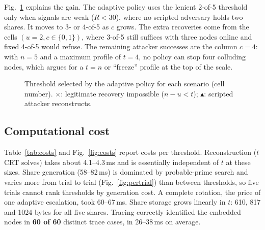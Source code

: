 \documentclass[conference]{IEEEtran}
\begin{document}
Fig.~\ref{fig:grid} explains the gain. The adaptive policy uses the lenient 2-of-5 threshold only when signals are weak ($R<30$), where no scripted adversary holds two shares. It moves to 3- or 4-of-5 as $c$ grows. The extra recoveries come from the cells $(u{=}2, c{\in}\{0,1\})$, where 3-of-5 still suffices with three nodes online and fixed 4-of-5 would refuse. The remaining attacker successes are the column $c=4$: with $n=5$ and a maximum profile of $t=4$, no policy can stop four colluding nodes, which argues for a $t=n$ or ``freeze'' profile at the top of the scale.

\begin{figure}[t]
\centering
{}
\caption{Threshold selected by the adaptive policy for each scenario (cell number). $\times$: legitimate recovery impossible ($n-u<t$); {\color{rsred}$\blacktriangle$}: scripted attacker reconstructs.}
\label{fig:grid}
\end{figure}

\subsection{Computational cost}
Table~\ref{tab:costs} and Fig.~\ref{fig:costs} report costs per threshold. Reconstruction ($t$ CRT solves) takes about 4.1--4.3\,ms and is essentially independent of $t$ at these sizes. Share generation (58--82\,ms) is dominated by probable-prime search and varies more from trial to trial (Fig.~\ref{fig:pertrial}) than between thresholds, so five trials cannot rank thresholds by generation cost. A complete rotation, the price of one adaptive escalation, took 60--67\,ms. Share storage grows linearly in $t$: 610, 817 and 1024 bytes for all five shares. Tracing correctly identified the embedded nodes in \textbf{60 of 60} distinct trace cases, in 26--38\,ms on average.
\end{document}
